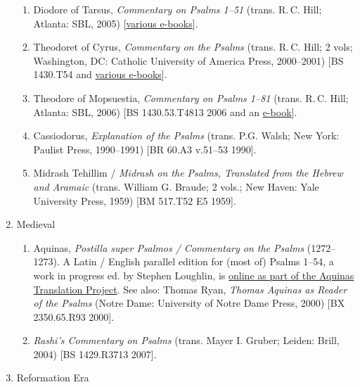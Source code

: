 \documentclass[titlepage]{article}
\begin{document}
\begin{enumerate}
\begin{enumerate}
	\item Diodore of Tarsus, \emph{Commentary on Psalms 1--51} (trans. R.\,C. Hill; Atlanta: SBL, 2005) [\href{http://tyndale.worldcat.org/oclc/191953419}{various e-books}].

	\item Theodoret of Cyrus, \emph{Commentary on the Psalms} (trans. R.\,C. Hill; 2 vols; Washington, DC: Catholic University of America Press, 2000--2001) [BS 1430.T54 and \href{http://tyndale.worldcat.org/oclc/41649596}{various e-books}].

	\item Theodore of Mopsuestia, \emph{Commentary on Psalms 1--81} (trans. R.\,C. Hill; Atlanta: SBL, 2006) [BS 1430.53.T4813 2006 and an \href{http://ezproxy.mytyndale.ca:2048/login?url=http://hdl.handle.net/2027/heb.07760.0001.001}{e-book}].

	\item Cassiodorus, \emph{Explanation of the Psalms} (trans. P.G. Walsh; New York: Paulist Press, 1990--1991) [BR 60.A3 v.51--53 1990].

	\item Midrash Tehillim / \emph{Midrash on the Psalms, Translated from the Hebrew and Aramaic} (trans. William G. Braude; 2 vols.; New Haven: Yale University Press, 1959) [BM 517.T52 E5 1959].

  \end{enumerate}
 \item Medieval
  \begin{enumerate}

	\item Aquinas, \emph{Postilla super Psalmos / Commentary on the Psalms} (1272--1273). A Latin / English parallel edition for (most of) Psalms 1--54, a work in progress ed. by Stephen Loughlin, is \href{http://www4.desales.edu/~philtheo/loughlin/ATP/}{online as part of the Aquinas Translation Project}. See also: Thomas Ryan, \emph{Thomas Aquinas as Reader of the Psalms} (Notre Dame: University of Notre Dame Press, 2000) [BX 2350.65.R93 2000].

	\item \emph{Rashi’s Commentary on Psalms} (trans. Mayer I. Gruber; Leiden: Brill, 2004) [BS 1429.R3713 2007]. %

  \end{enumerate}
 \item Reformation Era
  \begin{enumerate}


\end{enumerate}
\end{enumerate}
\end{document}
